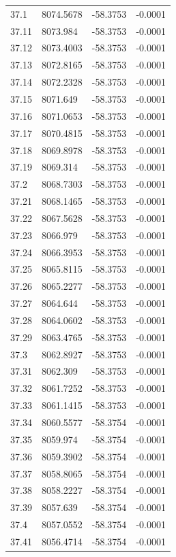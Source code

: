 \begin{table}[H]
\begin{tabular}{llll}
37.1 & 8074.5678 & -58.3753 & -0.0001 \\
37.11 & 8073.984 & -58.3753 & -0.0001 \\
37.12 & 8073.4003 & -58.3753 & -0.0001 \\
37.13 & 8072.8165 & -58.3753 & -0.0001 \\
37.14 & 8072.2328 & -58.3753 & -0.0001 \\
37.15 & 8071.649 & -58.3753 & -0.0001 \\
37.16 & 8071.0653 & -58.3753 & -0.0001 \\
37.17 & 8070.4815 & -58.3753 & -0.0001 \\
37.18 & 8069.8978 & -58.3753 & -0.0001 \\
37.19 & 8069.314 & -58.3753 & -0.0001 \\
37.2 & 8068.7303 & -58.3753 & -0.0001 \\
37.21 & 8068.1465 & -58.3753 & -0.0001 \\
37.22 & 8067.5628 & -58.3753 & -0.0001 \\
37.23 & 8066.979 & -58.3753 & -0.0001 \\
37.24 & 8066.3953 & -58.3753 & -0.0001 \\
37.25 & 8065.8115 & -58.3753 & -0.0001 \\
37.26 & 8065.2277 & -58.3753 & -0.0001 \\
37.27 & 8064.644 & -58.3753 & -0.0001 \\
37.28 & 8064.0602 & -58.3753 & -0.0001 \\
37.29 & 8063.4765 & -58.3753 & -0.0001 \\
37.3 & 8062.8927 & -58.3753 & -0.0001 \\
37.31 & 8062.309 & -58.3753 & -0.0001 \\
37.32 & 8061.7252 & -58.3753 & -0.0001 \\
37.33 & 8061.1415 & -58.3753 & -0.0001 \\
37.34 & 8060.5577 & -58.3754 & -0.0001 \\
37.35 & 8059.974 & -58.3754 & -0.0001 \\
37.36 & 8059.3902 & -58.3754 & -0.0001 \\
37.37 & 8058.8065 & -58.3754 & -0.0001 \\
37.38 & 8058.2227 & -58.3754 & -0.0001 \\
37.39 & 8057.639 & -58.3754 & -0.0001 \\
37.4 & 8057.0552 & -58.3754 & -0.0001 \\
37.41 & 8056.4714 & -58.3754 & -0.0001 \\

\end{tabular}
\end{table}
